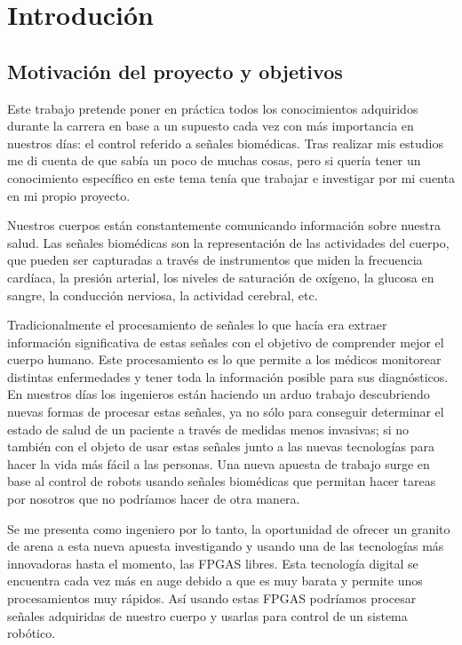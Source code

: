 \chapter{Introdución}\label{sec:intro}
\section{Motivación del proyecto y objetivos}


Este trabajo pretende poner en práctica todos los conocimientos adquiridos durante la carrera en base a un supuesto cada vez con más importancia en nuestros días: el control referido a señales biomédicas. Tras realizar mis estudios me di cuenta de que sabía un poco de muchas cosas, pero si quería tener un conocimiento específico en este tema tenía que trabajar e investigar por mi cuenta en mi propio proyecto.\newline

Nuestros cuerpos están constantemente comunicando información sobre nuestra salud. Las señales biomédicas son la representación de las actividades del cuerpo, que pueden ser capturadas a través de instrumentos que miden la frecuencia cardíaca, la presión arterial, los niveles de saturación de oxígeno, la glucosa en sangre, la conducción nerviosa, la actividad cerebral, etc.\newline

 Tradicionalmente el procesamiento de señales lo que hacía era extraer información significativa de estas señales con el objetivo de comprender mejor el cuerpo humano. Este procesamiento es lo que permite a los médicos monitorear distintas enfermedades y tener toda la información posible para sus diagnósticos. \newline En nuestros días los ingenieros están haciendo un arduo trabajo descubriendo nuevas formas de procesar estas señales, ya no sólo para conseguir determinar el estado de salud de un paciente a través de medidas menos invasivas; si no también con el objeto de usar estas señales junto a las nuevas tecnologías para hacer la vida más fácil a las personas. Una nueva apuesta de trabajo surge en base  al control de robots usando señales biomédicas que permitan hacer tareas por nosotros que no podríamos hacer de otra manera. \newline

Se me presenta como ingeniero por lo tanto, la oportunidad de ofrecer un granito de arena a esta nueva apuesta investigando y usando una de las tecnologías más innovadoras hasta el momento, las FPGAS libres.  Esta tecnología digital se encuentra cada vez más en auge debido a que es muy barata y permite unos procesamientos muy rápidos. Así usando estas FPGAS podríamos procesar señales adquiridas de nuestro cuerpo y usarlas para control de un sistema robótico. \newline

